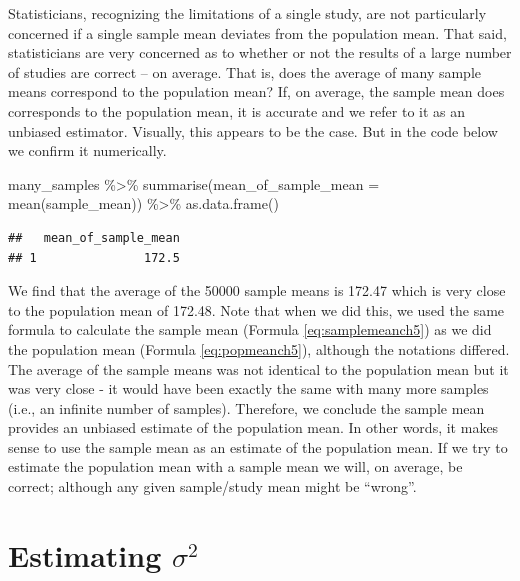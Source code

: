 \documentclass[
]{krantz}
\makeatletter
\newenvironment{Shaded}{\begin{snugshade}}{\end{snugshade}}
\newcommand{\AttributeTok}[1]{\textcolor[rgb]{0.61,0.61,0.61}{#1}}
\newcommand{\FunctionTok}[1]{\textcolor[rgb]{0,0,0}{#1}}
\newcommand{\NormalTok}[1]{#1}
\newcommand{\SpecialCharTok}[1]{\textcolor[rgb]{0,0,0}{#1}}
\newenvironment{kframe}{%
\medskip{}
\setlength{\fboxsep}{.8em}
 \def\at@end@of@kframe{}%
 \ifinner\ifhmode%
  \def\at@end@of@kframe{\end{minipage}}%
  \begin{minipage}{\columnwidth}%
 \fi\fi%
 \def\FrameCommand##1{\hskip\@totalleftmargin \hskip-\fboxsep
 \colorbox{shadecolor}{##1}\hskip-\fboxsep
     \hskip-\linewidth \hskip-\@totalleftmargin \hskip\columnwidth}%
 \MakeFramed {\advance\hsize-\width
   \@totalleftmargin\z@ \linewidth\hsize
   \@setminipage}}%
 {\par\unskip\endMakeFramed%
 \at@end@of@kframe}
\renewenvironment{Shaded}{\begin{kframe}}{\end{kframe}}
\makeatother
\begin{document}
Statisticians, recognizing the limitations of a single study, are not particularly concerned if a single sample mean deviates from the population mean. That said, statisticians are very concerned as to whether or not the results of a large number of studies are correct -- on average. That is, does the average of many sample means correspond to the population mean? If, on average, the sample mean does corresponds to the population mean, it is accurate and we refer to it as an unbiased estimator. Visually, this appears to be the case. But in the code below we confirm it numerically.

\begin{Shaded}
\begin{Highlighting}[]
\NormalTok{many\_samples }\SpecialCharTok{\%\textgreater{}\%}
  \FunctionTok{summarise}\NormalTok{(}\AttributeTok{mean\_of\_sample\_mean =} \FunctionTok{mean}\NormalTok{(sample\_mean)) }\SpecialCharTok{\%\textgreater{}\%}
  \FunctionTok{as.data.frame}\NormalTok{()}
\end{Highlighting}
\end{Shaded}

\begin{verbatim}
##   mean_of_sample_mean
## 1               172.5
\end{verbatim}

We find that the average of the 50000 sample means is 172.47 which is very close to the population mean of 172.48. Note that when we did this, we used the same formula to calculate the sample mean (Formula \eqref{eq:samplemeanch5}) as we did the population mean (Formula \eqref{eq:popmeanch5}), although the notations differed. The average of the sample means was not identical to the population mean but it was very close - it would have been exactly the same with many more samples (i.e., an infinite number of samples). Therefore, we conclude the sample mean provides an unbiased estimate of the population mean. In other words, it makes sense to use the sample mean as an estimate of the population mean. If we try to estimate the population mean with a sample mean we will, on average, be correct; although any given sample/study mean might be ``wrong''.

\hypertarget{estimating-sigma2}{%
\section{\texorpdfstring{Estimating \(\sigma^2\)}{Estimating \textbackslash sigma\^{}2}}\label{estimating-sigma2}}
\end{document}
